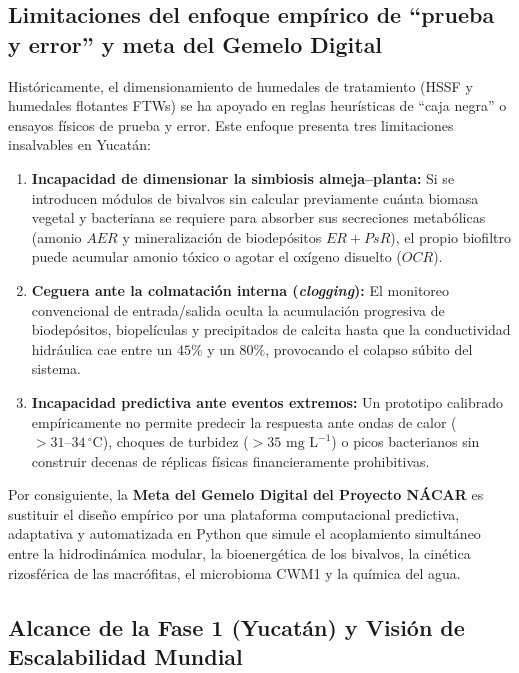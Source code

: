 \documentclass[11pt,letterpaper]{article}
\begin{document}
\subsection{Limitaciones del enfoque empírico de ``prueba y error'' y meta del Gemelo Digital}
Históricamente, el dimensionamiento de humedales de tratamiento (HSSF y humedales flotantes FTWs) se ha apoyado en reglas heurísticas de ``caja negra'' o ensayos físicos de prueba y error. Este enfoque presenta tres limitaciones insalvables en Yucatán:
\begin{enumerate}[leftmargin=1.5em]
    \item \textbf{Incapacidad de dimensionar la simbiosis almeja--planta:} Si se introducen módulos de bivalvos sin calcular previamente cuánta biomasa vegetal y bacteriana se requiere para absorber sus secreciones metabólicas (amonio $AER$ y mineralización de biodepósitos $ER+PsR$), el propio biofiltro puede acumular amonio tóxico o agotar el oxígeno disuelto ($OCR$).
    \item \textbf{Ceguera ante la colmatación interna (\textit{clogging}):} El monitoreo convencional de entrada/salida oculta la acumulación progresiva de biodepósitos, biopelículas y precipitados de calcita hasta que la conductividad hidráulica cae entre un $45\%$ y un $80\%$, provocando el colapso súbito del sistema.
    \item \textbf{Incapacidad predictiva ante eventos extremos:} Un prototipo calibrado empíricamente no permite predecir la respuesta ante ondas de calor ($>31\text{--}34\,^\circ\text{C}$), choques de turbidez ($>35\text{ mg L}^{-1}$) o picos bacterianos sin construir decenas de réplicas físicas financieramente prohibitivas.
\end{enumerate}

Por consiguiente, la \textbf{Meta del Gemelo Digital del Proyecto NÁCAR} es sustituir el diseño empírico por una plataforma computacional predictiva, adaptativa y automatizada en Python que simule el acoplamiento simultáneo entre la hidrodinámica modular, la bioenergética de los bivalvos, la cinética rizosférica de las macrófitas, el microbioma CWM1 y la química del agua.

\subsection{Alcance de la Fase 1 (Yucatán) y Visión de Escalabilidad Mundial}
\end{document}
